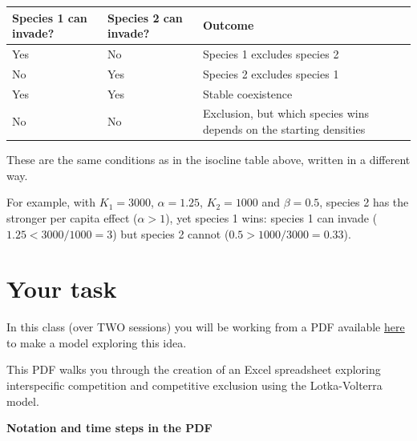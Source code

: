 \documentclass[
  a4paper]{book}
\newcounter{none} %
\begin{document}
{\def\LTcaptype{none} %
\begin{longtable}[]{@{}
  >{\raggedright\arraybackslash}p{}
  >{\raggedright\arraybackslash}p{}
  >{\raggedright\arraybackslash}p{}@{}}
\toprule\noalign{}
\begin{minipage}[b]{\linewidth}\raggedright
Species 1 can invade?
\end{minipage} & \begin{minipage}[b]{\linewidth}\raggedright
Species 2 can invade?
\end{minipage} & \begin{minipage}[b]{\linewidth}\raggedright
Outcome
\end{minipage} \\
\midrule\noalign{}
\endhead
\bottomrule\noalign{}
\endlastfoot
Yes & No & Species 1 excludes species 2 \\
No & Yes & Species 2 excludes species 1 \\
Yes & Yes & Stable coexistence \\
No & No & Exclusion, but which species wins depends on the starting densities \\
\end{longtable}
}

These are the same conditions as in the isocline table above, written in a different way.

For example, with \(K_1 = 3000\), \(\alpha = 1.25\), \(K_2 = 1000\) and \(\beta = 0.5\), species 2 has the stronger per capita effect (\(\alpha > 1\)), yet species 1 wins: species 1 can invade (\(1.25 < 3000/1000 = 3\)) but species 2 cannot (\(0.5 > 1000/3000 = 0.33\)).

\section{Your task}\label{your-task-17}

In this class (over TWO sessions) you will be working from a PDF available \href{https://www.dropbox.com/s/oukr39oq0rsn8il/9.\%20Interspecific\%20Competition\%20and\%20Competitive\%20Exclusion.pdf?dl=1}{here} to make a model exploring this idea.

This PDF walks you through the creation of an Excel spreadsheet exploring interspecific competition and competitive exclusion using the Lotka-Volterra model.

\textbf{Notation and time steps in the PDF}
\end{document}
